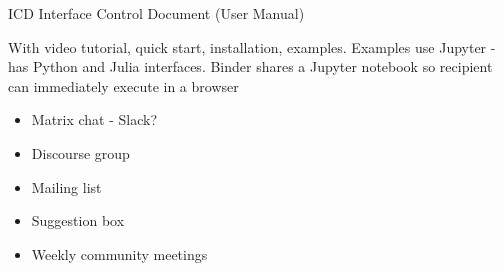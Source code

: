 ICD Interface Control Document (User Manual)

With video tutorial, quick start, installation, examples. %
Examples use Jupyter - has Python and Julia interfaces. Binder shares a Jupyter notebook so
recipient can immediately execute in a browser

\clearpage
{}
\begin{itemize}
\item Matrix chat - Slack?
\item Discourse group
\item Mailing list
\item Suggestion box
\item Weekly community meetings
\end{itemize}
